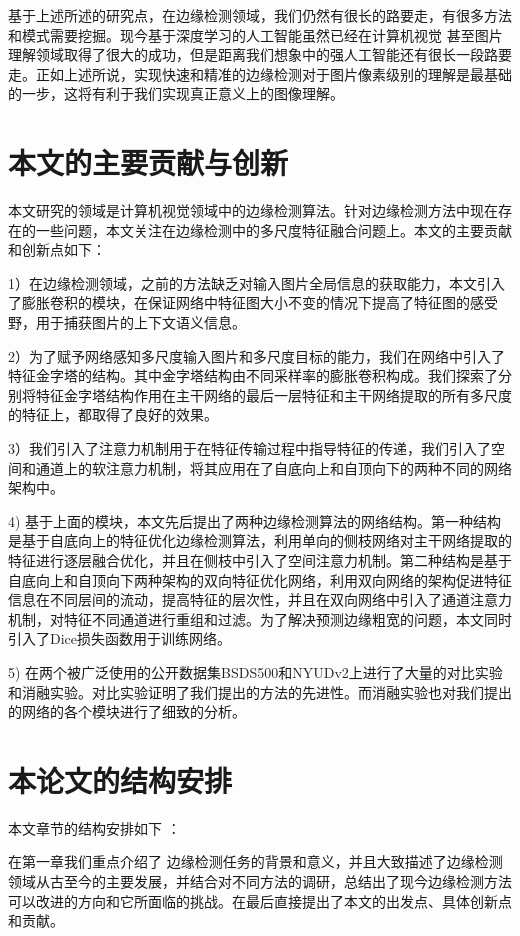 \documentclass[master]{thesis-uestc}
\begin{document}
基于上述所述的研究点，在边缘检测领域，我们仍然有很长的路要走，有很多方法和模式需要挖掘。现今基于深度学习的人工智能虽然已经在计算机视觉 甚至图片理解领域取得了很大的成功，但是距离我们想象中的强人工智能还有很长一段路要走。正如上述所说，实现快速和精准的边缘检测对于图片像素级别的理解是最基础的一步，这将有利于我们实现真正意义上的图像理解。

\section{本文的主要贡献与创新}
本文研究的领域是计算机视觉领域中的边缘检测算法。针对边缘检测方法中现在存在的一些问题，本文关注在边缘检测中的多尺度特征融合问题上。本文的主要贡献和创新点如下：

1）在边缘检测领域，之前的方法缺乏对输入图片全局信息的获取能力，本文引入了膨胀卷积的模块，在保证网络中特征图大小不变的情况下提高了特征图的感受野，用于捕获图片的上下文语义信息。

2）为了赋予网络感知多尺度输入图片和多尺度目标的能力，我们在网络中引入了特征金字塔的结构。其中金字塔结构由不同采样率的膨胀卷积构成。我们探索了分别将特征金字塔结构作用在主干网络的最后一层特征和主干网络提取的所有多尺度的特征上，都取得了良好的效果。

3）我们引入了注意力机制用于在特征传输过程中指导特征的传递，我们引入了空间和通道上的软注意力机制，将其应用在了自底向上和自顶向下的两种不同的网络架构中。

4) 基于上面的模块，本文先后提出了两种边缘检测算法的网络结构。第一种结构是基于自底向上的特征优化边缘检测算法，利用单向的侧枝网络对主干网络提取的特征进行逐层融合优化，并且在侧枝中引入了空间注意力机制。第二种结构是基于自底向上和自顶向下两种架构的双向特征优化网络，利用双向网络的架构促进特征信息在不同层间的流动，提高特征的层次性，并且在双向网络中引入了通道注意力机制，对特征不同通道进行重组和过滤。为了解决预测边缘粗宽的问题，本文同时引入了Dice损失函数用于训练网络。

5) 在两个被广泛使用的公开数据集BSDS500和NYUDv2上进行了大量的对比实验和消融实验。对比实验证明了我们提出的方法的先进性。而消融实验也对我们提出的网络的各个模块进行了细致的分析。


\section{本论文的结构安排}
本文章节的结构安排如下 ：

在第一章我们重点介绍了 边缘检测任务的背景和意义，并且大致描述了边缘检测领域从古至今的主要发展，并结合对不同方法的调研，总结出了现今边缘检测方法可以改进的方向和它所面临的挑战。在最后直接提出了本文的出发点、具体创新点和贡献。
\end{document}
